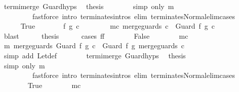 \begin{isabellebody}
\ termi{\isacharunderscore}merge\ Guard{\isachardot}hyps\ \isamarkupfalse%
\ {\isacharquery}thesis\isanewline
\ \ \ \ \ \ \isamarkupfalse%
\ {\isacharparenleft}simp\ only{\isacharcolon}\ m{\isacharparenright}\isanewline
\ \ \ \ \ \ \ \ \ {\isacharparenleft}fastforce\ intro{\isacharcolon}\ terminates{\isachardot}intros\ elim{\isacharcolon}\ terminates{\isacharunderscore}Normal{\isacharunderscore}elim{\isacharunderscore}cases{\isacharparenright}\isanewline
\ \ \isamarkupfalse%
\isanewline
\ \ \ \ \isamarkupfalse%
\ True\isanewline
\ \ \ \ \isamarkupfalse%
\ \isamarkupfalse%
\ f{\isacharprime}\ g{\isacharprime}\ c{\isacharprime}\ \ \isanewline
\ \ \ \ \ \ mc{\isacharcolon}\ {\isachardoublequoteopen}merge{\isacharunderscore}guards\ c\ {\isacharequal}\ Guard\ f{\isacharprime}\ g{\isacharprime}\ c{\isacharprime}{\isachardoublequoteclose}\isanewline
\ \ \ \ \ \ \isamarkupfalse%
\ blast\isanewline
\ \ \ \ \isamarkupfalse%
\ {\isacharquery}thesis\isanewline
\ \ \ \ \isamarkupfalse%
\ {\isacharparenleft}cases\ {\isachardoublequoteopen}f{\isacharequal}f{\isacharprime}{\isachardoublequoteclose}{\isacharparenright}\isanewline
\ \ \ \ \ \ \isamarkupfalse%
\ False\isanewline
\ \ \ \ \ \ \isamarkupfalse%
\ mc\ \isamarkupfalse%
\ m{\isacharcolon}\ {\isachardoublequoteopen}merge{\isacharunderscore}guards\ {\isacharparenleft}Guard\ f\ g\ c{\isacharparenright}\ {\isacharequal}\ Guard\ f\ g\ {\isacharparenleft}merge{\isacharunderscore}guards\ c{\isacharparenright}{\isachardoublequoteclose}\isanewline
\ \ \ \ \ \ \ \ \isamarkupfalse%
\ {\isacharparenleft}simp\ add{\isacharcolon}\ Let{\isacharunderscore}def{\isacharparenright}\isanewline
\ \ \ \ \ \ \isamarkupfalse%
\ termi{\isacharunderscore}merge\ Guard{\isachardot}hyps\ \isamarkupfalse%
\ {\isacharquery}thesis\isanewline
\ \ \ \ \ \ \isamarkupfalse%
\ {\isacharparenleft}simp\ only{\isacharcolon}\ m{\isacharparenright}\isanewline
\ \ \ \ \ \ \ \ \ {\isacharparenleft}fastforce\ intro{\isacharcolon}\ terminates{\isachardot}intros\ elim{\isacharcolon}\ terminates{\isacharunderscore}Normal{\isacharunderscore}elim{\isacharunderscore}cases{\isacharparenright}\isanewline
\ \ \ \ \isamarkupfalse%
\isanewline
\ \ \ \ \ \ \isamarkupfalse%
\ True\isanewline
\ \ \ \ \ \ \isamarkupfalse%
\ mc\ \isamarkupfalse%

\end{isabellebody}
